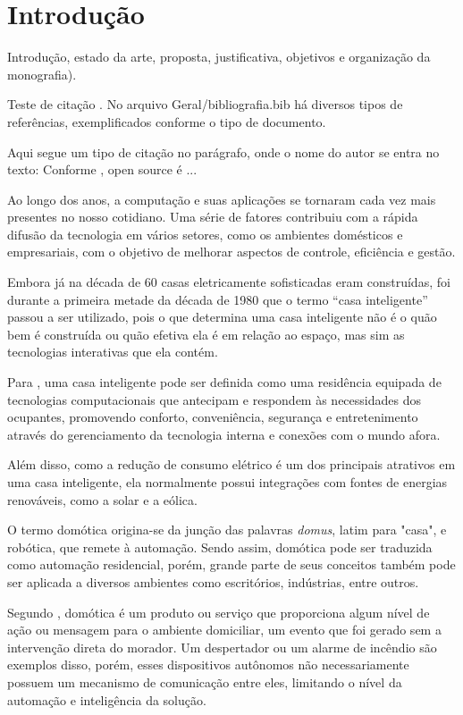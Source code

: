 \chapter{Introdução}
\label{cap:introducao}

Introdução, estado da arte, proposta, justificativa, objetivos e organização da
monografia).

Teste de citação \cite{Weka2014}. No arquivo Geral/bibliografia.bib há diversos tipos de referências,
exemplificados conforme o tipo de documento.

Aqui segue um tipo de citação no parágrafo, onde o nome do autor se entra no texto: Conforme
, open source é ...


Ao longo dos anos, a computação e suas aplicações se tornaram cada vez mais presentes no nosso cotidiano. Uma
série de fatores contribuiu com a rápida difusão da tecnologia em vários setores, como os ambientes domésticos
e empresariais, com o objetivo de melhorar aspectos de controle, eficiência e gestão.

Embora já na década de 60 casas eletricamente sofisticadas eram construídas, foi durante a primeira metade da
década de 1980 que o termo  ``casa inteligente'' passou a ser utilizado, pois o que determina uma casa
inteligente não é o quão bem é construída ou quão efetiva ela é em relação ao espaço, mas sim as tecnologias
interativas que ela contém. \cite{harper2003}

Para , uma casa inteligente pode ser definida como uma residência equipada de
tecnologias computacionais que antecipam e respondem às necessidades dos ocupantes, promovendo conforto,
conveniência, segurança e entretenimento através do gerenciamento da tecnologia interna e conexões com o mundo
afora.

Além disso, como a redução de consumo elétrico é um dos principais atrativos em uma casa inteligente, ela
normalmente possui integrações com fontes de energias renováveis, como a solar e a eólica.

O termo domótica origina-se da junção das palavras \textit{domus}, latim para "casa", e robótica, que remete à
automação. Sendo assim, domótica pode ser traduzida como automação residencial, porém, grande parte de seus
conceitos também pode ser aplicada a diversos ambientes como escritórios, indústrias, entre outros.

Segundo , domótica é um produto ou serviço que proporciona algum nível de ação ou
mensagem para o ambiente domiciliar, um evento que foi gerado sem a intervenção direta do morador. Um
despertador ou um alarme de incêndio são exemplos disso, porém, esses dispositivos autônomos não
necessariamente possuem um mecanismo de comunicação entre eles, limitando o nível da automação e inteligência
da solução.

